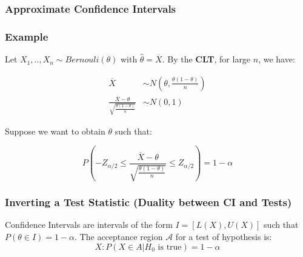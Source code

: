 \documentclass{article}
\begin{document}
\subsubsection{Approximate Confidence Intervals}
\subsubsection*{Example}
Let $X_1,..,X_n \sim Bernouli(\theta)$ with $\hat{\theta} = \overline{X}$. By the \textbf{CLT}, for large $n$, we have:

\begin{equation*}
    \begin{split}
        \overline{X} &\sim N\left(\theta, \frac{\theta(1-\theta)}{n} \right) \\
        \frac{\overline{X}-\theta}{\sqrt{\frac{\theta(1-\theta)}{n}}} &\sim N(0,1)
    \end{split}
\end{equation*}

Suppose we want to obtain $\theta$ such that:

\begin{equation*}
    P\left(-Z_{\alpha/2} \leq \frac{\overline{X}-\theta}{\sqrt{\frac{\theta(1-\theta)}{n}}} \leq Z_{\alpha/2} \right) = 1-\alpha
\end{equation*}

\subsubsection{Inverting a Test Statistic (Duality between CI and Tests)}

Confidence Intervals are intervals of the form $I = [L(X),U(X)]$ such that $P(\theta \in I) = 1-\alpha$. The acceptance region $ \mathcal{A} $ for a test of hypothesis is:
\begin{equation*}
    X: P(X\in A|H_0 \text{ is true}) = 1-\alpha
\end{equation*}
\end{document}
